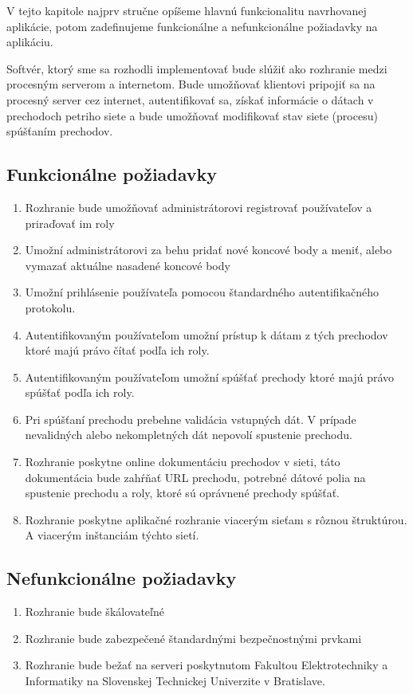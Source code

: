 V tejto kapitole najprv stručne opíšeme hlavnú funkcionalitu navrhovanej aplikácie, potom zadefinujeme funkcionálne a nefunkcionálne požiadavky na aplikáciu.

Softvér, ktorý sme sa rozhodli implementovať bude slúžiť ako rozhranie medzi procesným serverom a internetom. Bude umožňovať klientovi pripojiť sa na procesný server cez internet, autentifikovať sa, získať informácie o dátach v prechodoch petriho siete a bude umožňovať modifikovať stav siete (procesu) spúšťaním prechodov.

\subsection{Funkcionálne požiadavky}

\begin{enumerate}
\item Rozhranie bude umožňovať administrátorovi registrovať používateľov a priraďovať im roly
\item Umožní administrátorovi za behu pridať nové koncové body a meniť, alebo vymazať aktuálne nasadené koncové body
\item Umožní prihlásenie používateľa pomocou štandardného autentifikačného protokolu.
\item Autentifikovaným používateľom umožní prístup k dátam z tých prechodov ktoré majú právo čítať podľa ich roly.
\item Autentifikovaným používateľom umožní spúšťať prechody ktoré majú právo spúšťať podľa ich roly.
\item Pri spúšťaní prechodu prebehne validácia vstupných dát. V prípade nevalidných alebo nekompletných dát nepovolí spustenie prechodu.
\item Rozhranie poskytne online dokumentáciu prechodov v sieti, táto dokumentácia bude zahŕňať URL prechodu, potrebné dátové polia na spustenie prechodu a roly, ktoré sú oprávnené prechody spúšťať.
\item Rozhranie poskytne aplikačné rozhranie viacerým sieťam s rôznou štruktúrou. A viacerým inštanciám týchto sietí.
\end{enumerate}

\subsection{Nefunkcionálne požiadavky}
\begin{enumerate}
\item Rozhranie bude škálovateľné
\item Rozhranie bude zabezpečené štandardnými bezpečnostnými prvkami
\item Rozhranie bude bežať na serveri poskytnutom Fakultou Elektrotechniky a Informatiky na Slovenskej Technickej Univerzite v Bratislave.
\end{enumerate}

